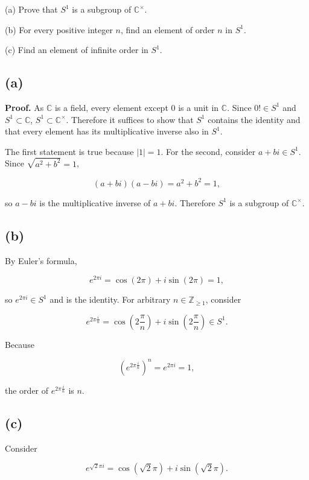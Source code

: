 (a) Prove that \(S^{1}\) is a subgroup of \(\mathbb{C}^{\times}\).

(b) For every positive integer \(n\), find an element of order \(n\) in \(S^{1}\).

(c) Find an element of infinite order in \(S^{1}\).

\subsection{(a)}

\textbf{Proof.} As \(\mathbb{C}\) is a field, every element except \(0\) is a unit in \(\mathbb{C}\). Since \(0! \in S^{1}\) and \(S^{1} \subset \mathbb{C}\), \(S^{1} \subset \mathbb{C}^{\times}\). Therefore it suffices to show that \(S^{1}\) contains the identity and that every element has its multiplicative inverse also in \(S^{1}\).

The first statement is true because \(|1| = 1\). For the second, consider \(a + bi \in S^{1}\). Since \(\sqrt{a^{2} + b^{2}} = 1\),

\[\left( {a + bi} \right)\left( {a - bi} \right) = a^{2} + b^{2} = 1,\]

so \(a - bi\) is the multiplicative inverse of \(a + bi\). Therefore \(S^{1}\) is a subgroup of \(\mathbb{C}^{\times}\).

\subsection{(b)}

By Euler's formula,

\[e^{2\pi i} = \cos\left( {2\pi} \right) + i\sin\left( {2\pi} \right) = 1,\]

so \(e^{2\pi i} \in S^{1}\) and is the identity. For arbitrary \(n \in \mathbb{Z}_{\geq 1}\), consider

\[e^{2\pi\frac{i}{n}} = \cos\left( {2\frac{\pi}{n}} \right) + i\sin\left( {2\frac{\pi}{n}} \right) \in S^{1}.\]

Because

\[\left( e^{2\pi\frac{i}{n}} \right)^{n} = e^{2\pi i} = 1,\]

the order of \(e^{2\pi\frac{i}{n}}\) is \(n\).

\subsection{(c)}

Consider

\[e^{\sqrt{2}\pi i} = \cos\left( {\sqrt{2}\pi} \right) + i\sin\left( {\sqrt{2}\pi} \right).\]

